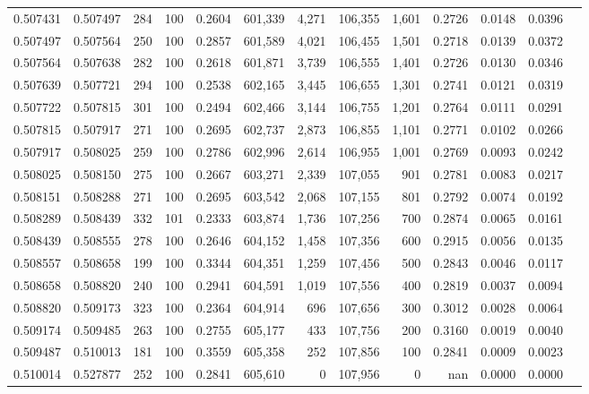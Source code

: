 \begin{tabular}{rrrrrrrrrrrrr}
0.507431 & 0.507497 &   284 & 100 &                                     0.2604 & 601,339 &   4,271 & 106,355 &   1,601 & 0.2726 & 0.0148 & 0.0396 \\
0.507497 & 0.507564 &   250 & 100 &                                     0.2857 & 601,589 &   4,021 & 106,455 &   1,501 & 0.2718 & 0.0139 & 0.0372 \\
0.507564 & 0.507638 &   282 & 100 &                                     0.2618 & 601,871 &   3,739 & 106,555 &   1,401 & 0.2726 & 0.0130 & 0.0346 \\
0.507639 & 0.507721 &   294 & 100 &                                     0.2538 & 602,165 &   3,445 & 106,655 &   1,301 & 0.2741 & 0.0121 & 0.0319 \\
0.507722 & 0.507815 &   301 & 100 &                                     0.2494 & 602,466 &   3,144 & 106,755 &   1,201 & 0.2764 & 0.0111 & 0.0291 \\
0.507815 & 0.507917 &   271 & 100 &                                     0.2695 & 602,737 &   2,873 & 106,855 &   1,101 & 0.2771 & 0.0102 & 0.0266 \\
0.507917 & 0.508025 &   259 & 100 &                                     0.2786 & 602,996 &   2,614 & 106,955 &   1,001 & 0.2769 & 0.0093 & 0.0242 \\
0.508025 & 0.508150 &   275 & 100 &                                     0.2667 & 603,271 &   2,339 & 107,055 &     901 & 0.2781 & 0.0083 & 0.0217 \\
0.508151 & 0.508288 &   271 & 100 &                                     0.2695 & 603,542 &   2,068 & 107,155 &     801 & 0.2792 & 0.0074 & 0.0192 \\
0.508289 & 0.508439 &   332 & 101 &                                     0.2333 & 603,874 &   1,736 & 107,256 &     700 & 0.2874 & 0.0065 & 0.0161 \\
0.508439 & 0.508555 &   278 & 100 &                                     0.2646 & 604,152 &   1,458 & 107,356 &     600 & 0.2915 & 0.0056 & 0.0135 \\
0.508557 & 0.508658 &   199 & 100 &                                     0.3344 & 604,351 &   1,259 & 107,456 &     500 & 0.2843 & 0.0046 & 0.0117 \\
0.508658 & 0.508820 &   240 & 100 &                                     0.2941 & 604,591 &   1,019 & 107,556 &     400 & 0.2819 & 0.0037 & 0.0094 \\
0.508820 & 0.509173 &   323 & 100 &                                     0.2364 & 604,914 &     696 & 107,656 &     300 & 0.3012 & 0.0028 & 0.0064 \\
0.509174 & 0.509485 &   263 & 100 &                                     0.2755 & 605,177 &     433 & 107,756 &     200 & 0.3160 & 0.0019 & 0.0040 \\
0.509487 & 0.510013 &   181 & 100 &                                     0.3559 & 605,358 &     252 & 107,856 &     100 & 0.2841 & 0.0009 & 0.0023 \\
0.510014 & 0.527877 &   252 & 100 &                                     0.2841 & 605,610 &       0 & 107,956 &       0 &    nan & 0.0000 & 0.0000 \\
\bottomrule
\end{tabular}
